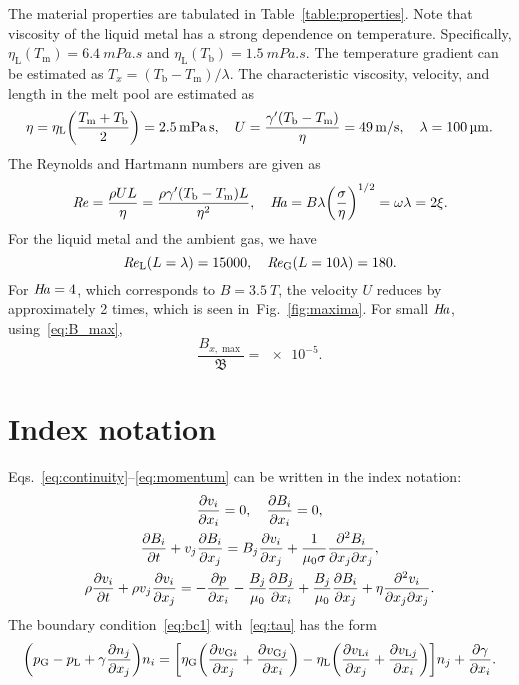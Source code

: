 \documentclass{article}
\newcommand{\liq}{\text{L}}
\newcommand{\gas}{\text{G}}
\newcommand{\boil}{\text{b}}
\newcommand{\melt}{\text{m}}
\newcommand{\Reyn}{\operatorname{\mathit{R\kern-.1em e}}}
\newcommand{\Hart}{\operatorname{\mathit{H\kern-.22em a}}}
\begin{document}
The material properties are tabulated in Table~\ref{table:properties}.
Note that viscosity of the liquid metal has a strong dependence on temperature.
Specifically, $\eta_\liq(T_\melt) = \SI{6.4}{mPa.s}$ and $\eta_\liq(T_\boil) = \SI{1.5}{mPa.s}$.
The temperature gradient can be estimated as $T_x=(T_\boil-T_\melt)/\lambda$.
The characteristic viscosity, velocity, and length in the melt pool are estimated as
\begin{equation}
    \eta = \eta_\liq\qty(\frac{T_\melt+T_\boil}{2}) = \SI{2.5}{mPa.s}, \quad
    U = \frac{\gamma'(T_\boil - T_\melt)}{\eta} = \SI{49}{m/s}, \quad
    \lambda = \SI{100}{\um}.
\end{equation}
The Reynolds and Hartmann numbers are given as
\begin{equation}
    \Reyn = \frac{\rho U L}{\eta} = \frac{\rho \gamma'(T_\boil - T_\melt) L}{\eta^2}, \quad
    \Hart = B\lambda\qty(\frac{\sigma}{\eta})^{1/2} = \omega\lambda = 2\xi.
\end{equation}
For the liquid metal and the ambient gas, we have
\begin{equation}
    \Reyn_\liq(L=\lambda) = 15000, \quad
    \Reyn_\gas(L=10\lambda) = 180.
\end{equation}
For $\Hart = 4$, which corresponds to $B = \SI{3.5}{T}$,
the velocity $U$ reduces by approximately 2 times, which is seen in~Fig.~\ref{fig:maxima}.
For small $\Hart$, using~\eqref{eq:B_max},
\begin{equation}
    \frac{B_{x,\max}}{\mathfrak{B}} = \num{e-5}.
\end{equation}

\appendix

\section{Index notation}

Eqs.~\eqref{eq:continuity}--\eqref{eq:momentum} can be written in the index notation:
\begin{gather}
    \pdv{v_i}{x_i} = 0, \quad \pdv{B_i}{x_i} = 0, \label{eq:continuityI}\\
    \pdv{B_i}{t} + v_j\pdv{B_i}{x_j} = B_j\pdv{v_i}{x_j} + \frac1{\mu_0\sigma} \pdv[2]{B_i}{x_j}{x_j}, \label{eq:BI}\\
    \rho\pdv{v_i}{t} + \rho v_j\pdv{v_i}{x_j}
    = -\pdv{p}{x_i} - \frac{B_j}{\mu_0}\pdv{B_j}{x_i} + \frac{B_j}{\mu_0}\pdv{B_i}{x_j} + \eta\pdv[2]{v_i}{x_j}{x_j}. \label{eq:momentumI}
\end{gather}
The boundary condition~\eqref{eq:bc1} with~\eqref{eq:tau} has the form
\begin{equation}\label{eq:bc1I}
    \qty(p_\gas - p_\liq + \gamma\pdv{n_j}{x_j})n_i
    = \qty[
        \eta_\gas\qty( \pdv{v_{\gas i}}{x_j} + \pdv{v_{\gas j}}{x_i} )
      - \eta_\liq\qty( \pdv{v_{\liq i}}{x_j} + \pdv{v_{\liq j}}{x_i} )
    ]n_j + \pdv{\gamma}{x_i}.
\end{equation}

\printbibliography
\end{document}
